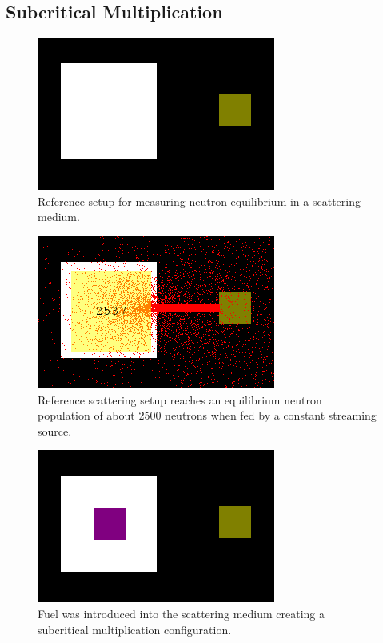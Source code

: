 \documentclass{anstrans}
\begin{document}
\subsection{Subcritical Multiplication}

\begin{figure}
    \centering
    \includegraphics{scatter-setup.png}
    \caption{Reference setup for measuring neutron equilibrium in a scattering medium.}
    \label{fig:scatter-setup}
\end{figure}

\begin{figure}
    \centering
    \includegraphics{scatter-equil.png}
    \caption{Reference scattering setup reaches an equilibrium neutron population of about 2500 neutrons when fed by a constant streaming source.}
    \label{fig:scatter-equil}
\end{figure}

\begin{figure}
    \centering
    \includegraphics{subcrit-mult-setup.png}
    \caption{Fuel was introduced into the scattering medium creating a subcritical multiplication configuration.}
    \label{fig:subcrit-setup}
\end{figure}
\end{document}
